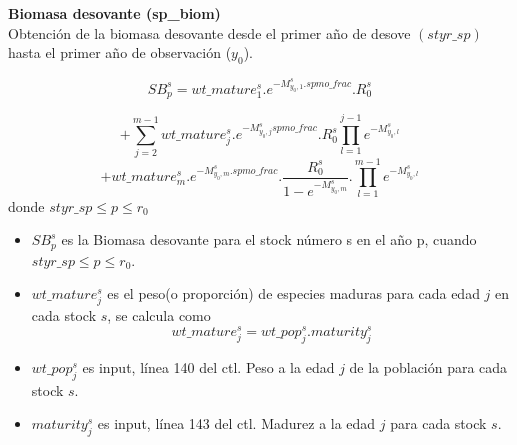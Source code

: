 \documentclass{article}
\begin{document}
\textbf{Biomasa desovante (sp\_biom)}\\
Obtención de la biomasa desovante desde el primer año de desove $\left(styr\_sp\right)$ hasta el primer año de observación ($y_0$).


\begin{equation}
    SB^s_p=wt\_mature^s_1.e^{-M^s_{y_0,1}.spmo\_frac}.R^s_0
\end{equation}


\begin{equation*}
    +\sum_{j=2}^{m-1}wt\_mature^s_j.e^{-M^s_{y_0,j} spmo\_frac}.R^s_0\prod_{l=1}^{j-1}e^{-M^s_{y_0,l}} 
\end{equation*}
\begin{equation*}
    + wt\_mature^s_{m}.e^{-M^s_{y_0,m}.spmo\_frac}.\dfrac{R^s_0}{1-e^{-M^s_{y_0,m}}}.\prod_{l=1}^{m-1}e^{-M^s_{y_0,l}}
\end{equation*}
donde $styr\_sp\leq p \leq r_0$
\begin{itemize}
   \item $SB^s_p$ es la Biomasa desovante para el stock número s en el año p, cuando  $styr\_sp\leq p \leq r_0$. 
   \item $wt\_mature^s_j$ es el peso(o proporción) de especies maduras para cada edad $j$ en cada stock $s$, se calcula como
    \begin{equation}
        wt\_mature^s_j=wt\_pop^s_j.maturity^s_j
    \end{equation}
    \item $wt\_pop^s_j$ es input, línea 140 del ctl. Peso a la edad $j$ de la población para cada stock $s$.
    \item $maturity^s_j$ es input, línea 143 del ctl. Madurez a la edad $j$ para cada stock $s$.
\end{itemize}
\end{document}
